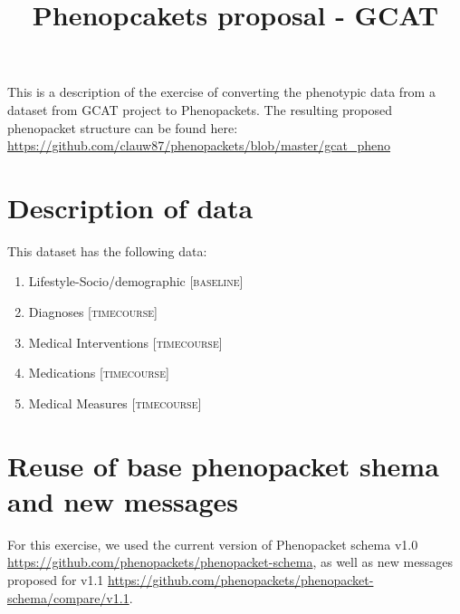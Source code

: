 \documentclass[a4paper, 10pt]{article}
\title{Phenopcakets proposal - GCAT}
\begin{document}
\date{}
\maketitle




This is a description of the exercise of converting the phenotypic data from a dataset from GCAT project to Phenopackets. The resulting proposed phenopacket structure can be found here: \url{https://github.com/clauw87/phenopackets/blob/master/gcat_pheno}


\section{Description of data}


This dataset has the following data:
\begin{enumerate}
\item{Lifestyle-Socio/demographic} \textsc{[baseline]}
\item{Diagnoses} \textsc{[timecourse]}
\item{Medical Interventions} \textsc{[timecourse]}
 \item{Medications} \textsc{[timecourse]}
 \item{Medical Measures} \textsc{[timecourse]}
\end{enumerate}



\section{Reuse of base phenopacket shema and new messages}

For this exercise, we used the current version of Phenopacket schema v1.0 \url{https://github.com/phenopackets/phenopacket-schema}, %
as well as new messages proposed for v1.1 \url{https://github.com/phenopackets/phenopacket-schema/compare/v1.1}.
\end{document}
